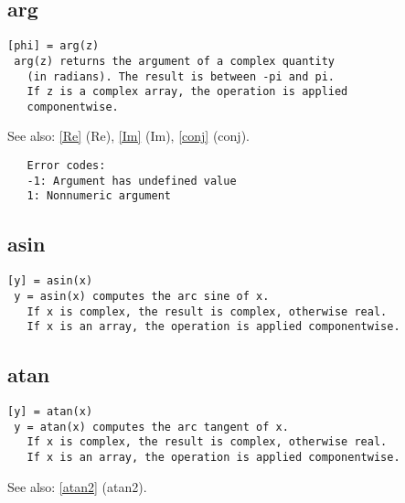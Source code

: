 \documentclass[a4paper]{article}
\begin{document}
\subsection{arg\label{arg}}

\begin{tscreen}
\begin{verbatim}
[phi] = arg(z)
 arg(z) returns the argument of a complex quantity
   (in radians). The result is between -pi and pi.
   If z is a complex array, the operation is applied
   componentwise.
\end{verbatim}

See also: \ref{Re} {(Re)}, \ref{Im} {(Im)}, \ref{conj} {(conj)}.
\begin{verbatim}
   Error codes:
   -1: Argument has undefined value
   1: Nonnumeric argument 
\end{verbatim}
\end{tscreen}





\subsection{asin\label{asin}}

\begin{tscreen}
\begin{verbatim}
[y] = asin(x)
 y = asin(x) computes the arc sine of x.
   If x is complex, the result is complex, otherwise real.
   If x is an array, the operation is applied componentwise.
\end{verbatim}
\end{tscreen}





\subsection{atan\label{atan}}

\begin{tscreen}
\begin{verbatim}
[y] = atan(x)
 y = atan(x) computes the arc tangent of x.
   If x is complex, the result is complex, otherwise real.
   If x is an array, the operation is applied componentwise.
\end{verbatim}

See also: \ref{atan2} {(atan2)}.
\end{tscreen}
\end{document}
